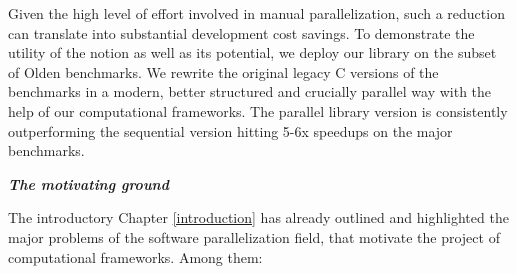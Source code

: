 \quad Given the high level of effort involved in manual parallelization, such a reduction can translate into substantial development cost savings. To demonstrate the utility of the notion as well as its potential, we deploy our library on the subset of Olden benchmarks. We rewrite the original legacy C versions of the benchmarks in a modern, better structured and crucially parallel way with the help of our computational frameworks. The parallel library version is consistently outperforming the sequential version hitting 5-6x speedups on the major benchmarks.
\begin{center}
\textbf{\large \textit{The motivating ground}}
\end{center}
\quad The introductory Chapter \ref{introduction} has already outlined and highlighted the major problems of the software parallelization field, that motivate the project of computational frameworks. Among them:
